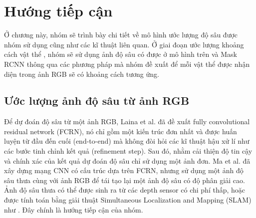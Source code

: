 \chapter{Hướng tiếp cận}



Ở chương này, nhóm sẽ trình bày chi tiết về mô hình ước lượng độ sâu được nhóm sử dụng cũng như các kĩ thuật liên quan.
Ở giai đoạn ước lượng khoảng cách vật thể , nhóm sẽ sử dụng ảnh độ sâu có được ở mô hình trên và Mask RCNN\cite{He2017MaskR} thông qua các phương pháp mà nhóm đề xuất để mỗi vật thể được nhận diện trong ảnh RGB sẽ có khoảng cách tương ứng.

\section{Ước lượng ảnh độ sâu từ ảnh RGB}
Để dự đoán độ sâu từ một ảnh RGB, Laina et al. \cite{laina2016deeper} đã đề xuất fully convolutional residual network (FCRN), nó chỉ gồm một kiến trúc đơn nhất và được huấn luyện từ đầu đến cuối (end-to-end) mà không đòi hỏi các kĩ thuật hậu xử lí như các bước tinh chỉnh kết quả (refinement step). Sau đó, nhằm cải thiện độ tin cậy và chính xác của kết quả dự đoán độ sâu chỉ sử dụng một ảnh đơn. Ma et al. \cite{Ma2017SparseToDense} đã xây dựng mạng CNN có cấu trúc dựa trên FCRN, nhưng sử dụng một ảnh độ sâu thưa cùng với ảnh RGB để tái tạo lại một ảnh độ sâu có độ phân giải cao. Ảnh độ sâu thưa có thể được sinh ra từ các depth sensor có chi phí thấp, hoặc được tính toán bằng giải thuật Simultaneous Localization and Mapping (SLAM) như \cite{SLAM}. Đây chính là hướng tiếp cận của nhóm.\\


